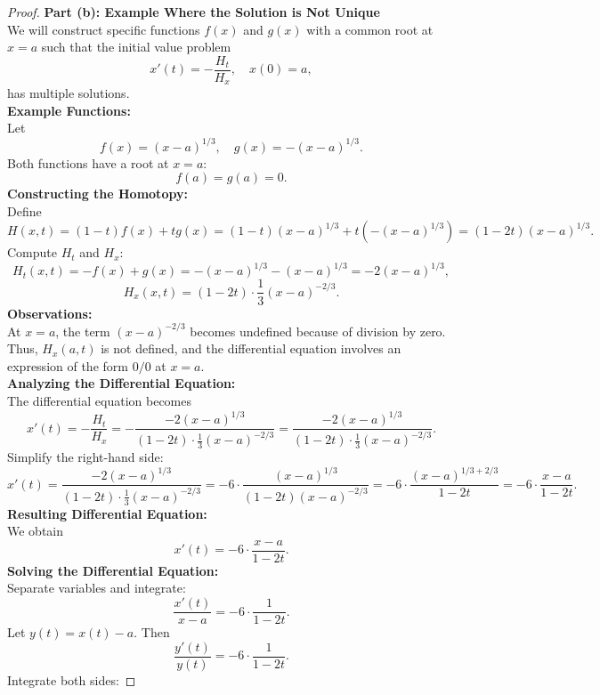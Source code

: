 \documentclass{article}
\begin{document}
\begin{proof}
    \textbf{Part (b): Example Where the Solution is Not Unique}
    \\
    We will construct specific functions \( f(x) \) and \( g(x) \) with a common root at \( x = a \) such that the initial value problem
    \[
        x'(t) = -\frac{H_t}{H_x}, \quad x(0) = a,
    \]
    has multiple solutions.
    \\
    \textbf{Example Functions:}
    \\
    Let
    \[
        f(x) = (x - a)^{1/3}, \quad g(x) = -(x - a)^{1/3}.
    \]
    Both functions have a root at \( x = a \):
    \[
        f(a) = g(a) = 0.
    \]
    \textbf{Constructing the Homotopy:}
    \\
    Define
    \[
        H(x, t) = (1 - t) f(x) + t g(x) = (1 - t)(x - a)^{1/3} + t ( - (x - a)^{1/3} ) = (1 - 2t)(x - a)^{1/3}.
    \]
    Compute \( H_t \) and \( H_x \):
    \[
        H_t(x, t) = -f(x) + g(x) = - (x - a)^{1/3} - (x - a)^{1/3} = -2 (x - a)^{1/3},
    \]
    \[
        H_x(x, t) = (1 - 2t) \cdot \frac{1}{3} (x - a)^{-2/3}.
    \]
    \textbf{Observations:}
    \\
    At \( x = a \), the term \( (x - a)^{-2/3} \) becomes undefined because of division by zero. Thus, \( H_x(a, t) \) is not defined, and the differential equation involves an expression of the form \( 0/0 \) at \( x = a \).
    \\
    \textbf{Analyzing the Differential Equation:}
    \\
    The differential equation becomes
    \[
        x'(t) = -\frac{H_t}{H_x} = -\frac{ -2 (x - a)^{1/3} }{ (1 - 2t) \cdot \frac{1}{3} (x - a)^{-2/3} } = \frac{ -2 (x - a)^{1/3} }{ (1 - 2t) \cdot \frac{1}{3} (x - a)^{-2/3} }.
    \]
    Simplify the right-hand side:
    \[
        x'(t) = \frac{ -2 (x - a)^{1/3} }{ (1 - 2t) \cdot \frac{1}{3} (x - a)^{-2/3} } = -6 \cdot \frac{ (x - a)^{1/3} }{ (1 - 2t)(x - a)^{-2/3} } = -6 \cdot \frac{ (x - a)^{1/3 + 2/3} }{ 1 - 2t } = -6 \cdot \frac{ x - a }{ 1 - 2t }.
    \]
    \textbf{Resulting Differential Equation:}
    \\
    We obtain
    \[
        x'(t) = -6 \cdot \frac{ x - a }{ 1 - 2t }.
    \]
    \textbf{Solving the Differential Equation:}
    \\
    Separate variables and integrate:
    \[
        \frac{ x'(t) }{ x - a } = -6 \cdot \frac{1}{1 - 2t}.
    \]
    Let \( y(t) = x(t) - a \). Then
    \[
        \frac{ y'(t) }{ y(t) } = -6 \cdot \frac{1}{1 - 2t}.
    \]
    Integrate both sides:

\end{proof}
\end{document}
